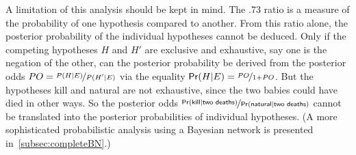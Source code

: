 \documentclass{article}
\newcommand{\pr}{\mathsf{Pr}}
\begin{document}

A limitation of this analysis should be kept in mind. The .73 ratio is a measure of the probability of one hypothesis compared to another.
From this ratio alone, the posterior probability of the individual hypotheses %
cannot be deduced.  %
Only if the competing hypotheses $H$ and $H'$ are exclusive and exhaustive, say one is the negation of the other, can the posterior probability be derived from the posterior odds $PO=\nicefrac{P(H \vert E)}{ P(H' \vert E)}$ via the equality $\pr(H\vert E)= \nicefrac{PO}{1+PO}$. 
But the hypotheses \textsf{kill} and \textsf{natural} are not exhaustive, since the two babies could have died in other ways. So the posterior odds
$ \nicefrac{\pr(\textsf{kill} \vert \textsf{two deaths})}{\pr(\textsf{natural} \vert \textsf{two deaths})}$ cannot be translated into the posterior probabilities of individual hypotheses. 
(A more sophisticated probabilistic analysis using a Bayesian network is presented in~\ref{subsec:completeBN}.)





\end{document}

